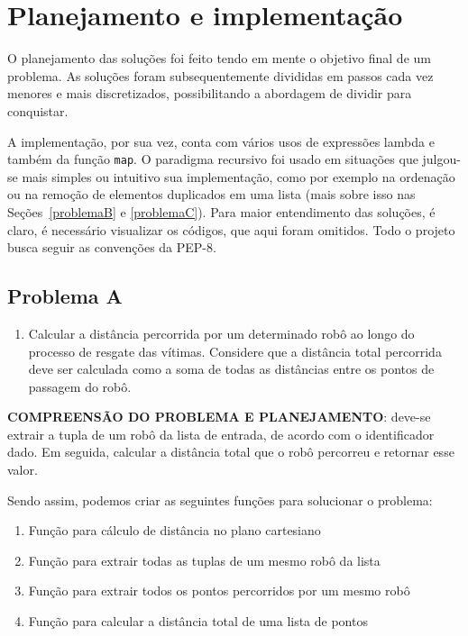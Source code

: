 \chapter{Planejamento e implementação}\label{cap-planejamento-implementacao}

O planejamento das soluções foi feito tendo em mente o objetivo final de um problema. As soluções foram subsequentemente divididas em passos cada vez menores e mais discretizados, possibilitando a abordagem de dividir para conquistar.

A implementação, por sua vez, conta com vários usos de expressões lambda e também da função \texttt{map}. O paradigma recursivo foi usado em situações que julgou-se mais simples ou intuitivo sua implementação, como por exemplo na ordenação ou na remoção de elementos duplicados em uma lista (mais sobre isso nas Seções~\ref{problemaB} e \ref{problemaC}). Para maior entendimento das soluções, é claro, é necessário visualizar os códigos, que aqui foram omitidos. Todo o projeto busca seguir as convenções da PEP-8. 

\section{Problema A}\label{problemaA}
\begin{enumerate}[label=\textbf{\alph*)},series=problemas]
\item Calcular a distância percorrida por um determinado robô ao longo do processo de resgate das vítimas. Considere que a distância total percorrida deve ser calculada como a soma de todas as distâncias entre os pontos de passagem do robô.
\end{enumerate}

\noindent \textbf{COMPREENSÃO DO PROBLEMA E PLANEJAMENTO}: deve-se extrair a tupla de um robô da lista de entrada, de acordo com o identificador dado. Em seguida, calcular a distância total que o robô percorreu e retornar esse valor.

Sendo assim, podemos criar as seguintes funções para solucionar o problema:
\begin{enumerate}
    \item Função para cálculo de distância no plano cartesiano
    \item Função para extrair todas as tuplas de um mesmo robô da lista
    \item Função para extrair todos os pontos percorridos por um mesmo robô 
    \item Função para calcular a distância total de uma lista de pontos
\end{enumerate}

